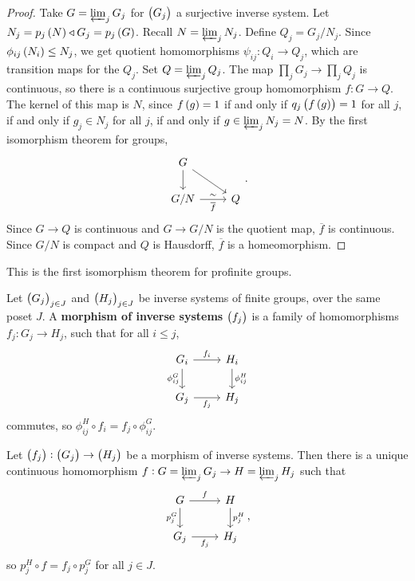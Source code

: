 \begin{proof}
Take $ G = \varprojlim_j G_j $ for $ \br{G_j} $ a surjective inverse system. Let $ N_j = p_j\br{N} \triangleleft G_j = p_j\br{G} $. Recall $ N = \varprojlim_j N_j $. Define $ Q_j = G_j / N_j $. Since $ \phi_{ij}\br{N_i} \le N_j $, we get quotient homomorphisms $ \psi_{ij} : Q_i \to Q_j $, which are transition maps for the $ Q_j $. Set $ Q = \varprojlim_j Q_j $. The map $ \prod_j G_j \to \prod_j Q_j $ is continuous, so there is a continuous surjective group homomorphism $ f : G \to Q $. The kernel of this map is $ N $, since $ f\br{g} = 1 $ if and only if $ q_j\br{f\br{g}} = 1 $ for all $ j $, if and only if $ g_j \in N_j $ for all $ j $, if and only if $ g \in \varprojlim_j N_j = N $. By the first isomorphism theorem for groups,
$$
\begin{tikzcd}
G \arrow{d} \arrow{dr} & \\
G / N \arrow{r}{\sim}[swap]{\overline{f}} & Q
\end{tikzcd}.
$$
Since $ G \to Q $ is continuous and $ G \to G / N $ is the quotient map, $ \overline{f} $ is continuous. Since $ G / N $ is compact and $ Q $ is Hausdorff, $ \overline{f} $ is a homeomorphism.
\end{proof}

This is the first isomorphism theorem for profinite groups.

\pagebreak


\begin{definition}
Let $ \br{G_j}_{j \in J} $ and $ \br{H_j}_{j \in J} $ be inverse systems of finite groups, over the same poset $ J $. A \textbf{morphism of inverse systems} $ \br{f_j} $ is a family of homomorphisms $ f_j : G_j \to H_j $, such that for all $ i \le j $,
$$
\begin{tikzcd}
G_i \arrow{r}{f_i} \arrow{d}[swap]{\phi_{ij}^G} & H_i \arrow{d}{\phi_{ij}^H} \\
G_j \arrow{r}[swap]{f_j} & H_j
\end{tikzcd}
$$
commutes, so $ \phi_{ij}^H \circ f_i = f_j \circ \phi_{ij}^G $.
\end{definition}

\begin{proposition}
Let $ \br{f_j} : \br{G_j} \to \br{H_j} $ be a morphism of inverse systems. Then there is a unique continuous homomorphism $ f : G = \varprojlim_j G_j \to H = \varprojlim_j H_j $ such that
$$
\begin{tikzcd}
G \arrow{r}{f} \arrow{d}[swap]{p_j^G} & H \arrow{d}{p_j^H} \\
G_j \arrow{r}[swap]{f_j} & H_j
\end{tikzcd},
$$
so $ p_j^H \circ f = f_j \circ p_j^G $ for all $ j \in J $.
\end{proposition}

